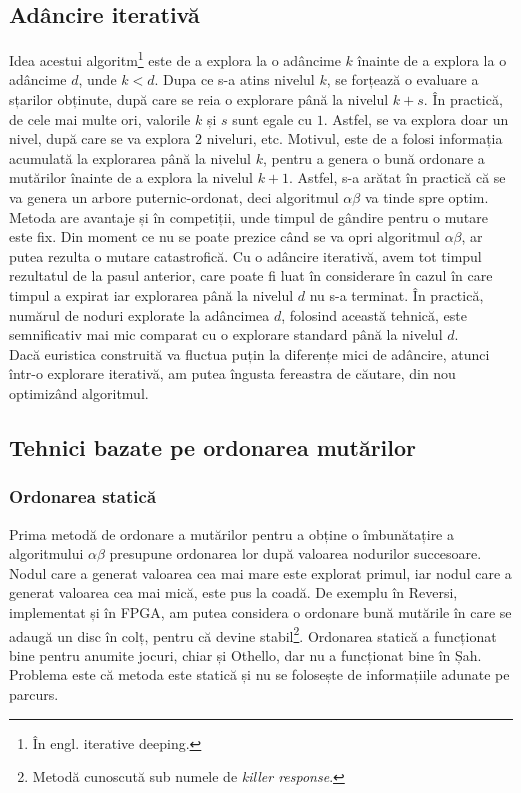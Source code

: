 \documentclass[12pt,twoside,a4paper,fleqn]{book}
\theoremstyle{definition}
\begin{document}
\subsection{Adâncire iterativă}
Idea acestui algoritm\footnote{În engl. iterative deeping.} este de a explora la o adâncime $k$ înainte de a explora la o adâncime $d$, unde $k < d$. Dupa ce s-a atins nivelul $k$, se forțează o evaluare a sțarilor obținute, după care se reia o explorare până la nivelul $k+s$. În practică, de cele mai multe ori, valorile $k$ și $s$ sunt egale cu $1$. Astfel, se va explora doar un nivel, după care se va explora $2$ niveluri, etc. Motivul, este de a folosi informația acumulată la explorarea până la nivelul $k$, pentru a genera o bună ordonare a mutărilor înainte de a explora la nivelul $k+1$. Astfel, s-a arătat în practică \cite{brokington} că se va genera un arbore puternic-ordonat, deci algoritmul $\alpha \beta$ va tinde spre optim. Metoda are avantaje și în competiții, unde timpul de gândire pentru o mutare este fix. Din moment ce nu se poate prezice când se va opri algoritmul $\alpha \beta$, ar putea rezulta o mutare catastrofică. Cu o adâncire iterativă, avem tot timpul rezultatul de la pasul anterior, care poate fi luat în considerare în cazul în care timpul a expirat iar explorarea până la nivelul $d$ nu s-a terminat. În practică, numărul de noduri explorate la adâncimea $d$, folosind această tehnică, este semnificativ mai mic comparat cu o explorare standard până la nivelul $d$.\\
Dacă euristica construită va fluctua puțin la diferențe mici de adâncire, atunci într-o explorare iterativă, am putea îngusta fereastra de căutare, din nou optimizând algoritmul.
\subsection{Tehnici bazate pe ordonarea mutărilor}

\subsubsection{Ordonarea statică}
\label{killer_moves}
Prima metodă de ordonare a mutărilor pentru a obține o îmbunătațire a algoritmului $\alpha \beta$ presupune ordonarea lor după valoarea nodurilor succesoare. Nodul care a generat valoarea cea mai mare este explorat primul, iar nodul care a generat valoarea cea mai mică, este pus la coadă. De exemplu în Reversi, implementat și în FPGA, am putea considera o ordonare bună mutările în care se adaugă un disc în colț, pentru că devine stabil\footnote{Metodă cunoscută sub numele de \emph{killer response}.}. Ordonarea statică a funcționat bine \cite{brokington} pentru anumite jocuri, chiar și Othello, dar nu a funcționat bine în Șah. Problema este că metoda este statică și nu se folosește de informațiile adunate pe parcurs.
\end{document}
